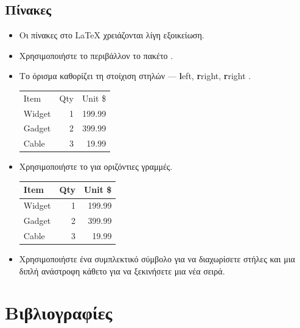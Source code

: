 \documentclass{beamer}
\begin{document}
\subsection{Πίνακες}
\begin{frame}[fragile]{\insertsubsection}
\begin{itemize}
\item Οι πίνακες στο \LaTeX{} χρειάζονται λίγη εξοικείωση.
\item Χρησιμοποιήστε το περιβάλλον \en {}\gr {} το πακέτο \en {}\gr.
\item 
Το όρισμα καθορίζει τη στοίχιση στηλών --- \en \textbf{l}eft, \textbf{r}right, \textbf{r}right \gr.
\en
\begin{exampletwouptiny}
\begin{tabular}{lrr}
Item   & Qty & Unit \$ \\
Widget & 1   & 199.99  \\
Gadget & 2   & 399.99  \\
Cable  & 3   & 19.99   \\
\end{tabular}
\end{exampletwouptiny}
\gr
\item Χρησιμοποιήστε το\en {} \gr για οριζόντιες γραμμές.
\en
\begin{exampletwouptiny}
\begin{tabular}{|l|r|r|} \hline
Item   & Qty & Unit \$ \\\hline
Widget & 1   & 199.99  \\
Gadget & 2   & 399.99  \\
Cable  & 3   & 19.99   \\\hline
\end{tabular}
\end{exampletwouptiny}
\gr
\item Χρησιμοποιήστε ένα συμπλεκτικό σύμβολο \keystrokebftt{\&} για να διαχωρίσετε στήλες και μια διπλή ανάστροφη κάθετο \en \keystrokebftt{\bs}\keystrokebftt{\bs} \gr για να ξεκινήσετε μια νέα σειρά.
\end{itemize}
\end{frame}

\section{Βιβλιογραφίες}
\end{document}
